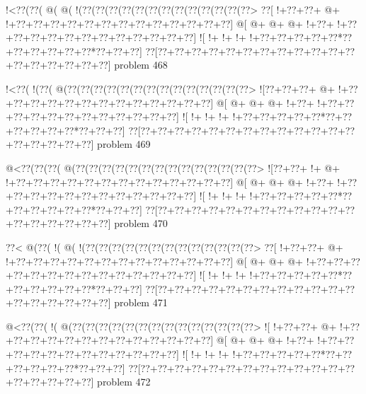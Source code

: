 \vbox{\vbox{\goo
\- !<\0??(\0??(\- @(\- @(\- !(\0??(\0??(\0??(\0??(\0??(\0??(\0??(\0??(\0??(\0??(\0??(\0??(\0??>
\0??[\- !+\0??+\0??+\- @+\- !+\0??+\0??+\0??+\0??+\0??+\0??+\0??+\0??+\0??+\0??+\0??+\0??+\0??]
\- @[\- @+\- @+\- @+\- !+\0??+\- !+\0??+\0??+\0??+\0??+\0??+\0??+\0??+\0??+\0??+\0??+\0??+\0??]
\- ![\- !+\- !+\- !+\- !+\0??+\0??+\0??+\0??+\0??*\0??+\0??+\0??+\0??+\0??+\0??*\0??+\0??+\0??]
\0??[\0??+\0??+\0??+\0??+\0??+\0??+\0??+\0??+\0??+\0??+\0??+\0??+\0??+\0??+\0??+\0??+\0??+\0??]
}
\hfil problem 468\hfil\break
}



\vbox{\vbox{\goo
\- !<\0??(\- !(\0??(\- @(\0??(\0??(\0??(\0??(\0??(\0??(\0??(\0??(\0??(\0??(\0??(\0??(\0??(\0??>
\- ![\0??+\0??+\0??+\- @+\- !+\0??+\0??+\0??+\0??+\0??+\0??+\0??+\0??+\0??+\0??+\0??+\0??+\0??]
\- @[\- @+\- @+\- @+\- !+\0??+\- !+\0??+\0??+\0??+\0??+\0??+\0??+\0??+\0??+\0??+\0??+\0??+\0??]
\- ![\- !+\- !+\- !+\- !+\0??+\0??+\0??+\0??+\0??*\0??+\0??+\0??+\0??+\0??+\0??*\0??+\0??+\0??]
\0??[\0??+\0??+\0??+\0??+\0??+\0??+\0??+\0??+\0??+\0??+\0??+\0??+\0??+\0??+\0??+\0??+\0??+\0??]
}
\hfil problem 469\hfil\break
}



\vbox{\vbox{\goo
\- @<\0??(\0??(\0??(\- @(\0??(\0??(\0??(\0??(\0??(\0??(\0??(\0??(\0??(\0??(\0??(\0??(\0??(\0??>
\- ![\0??+\0??+\- !+\- @+\- !+\0??+\0??+\0??+\0??+\0??+\0??+\0??+\0??+\0??+\0??+\0??+\0??+\0??]
\- @[\- @+\- @+\- @+\- !+\0??+\- !+\0??+\0??+\0??+\0??+\0??+\0??+\0??+\0??+\0??+\0??+\0??+\0??]
\- ![\- !+\- !+\- !+\- !+\0??+\0??+\0??+\0??+\0??*\0??+\0??+\0??+\0??+\0??+\0??*\0??+\0??+\0??]
\0??[\0??+\0??+\0??+\0??+\0??+\0??+\0??+\0??+\0??+\0??+\0??+\0??+\0??+\0??+\0??+\0??+\0??+\0??]
}
\hfil problem 470\hfil\break
}



\vbox{\vbox{\goo
\0??<\- @(\0??(\- !(\- @(\- !(\0??(\0??(\0??(\0??(\0??(\0??(\0??(\0??(\0??(\0??(\0??(\0??(\0??>
\0??[\- !+\0??+\0??+\- @+\- !+\0??+\0??+\0??+\0??+\0??+\0??+\0??+\0??+\0??+\0??+\0??+\0??+\0??]
\- @[\- @+\- @+\- @+\- !+\0??+\0??+\0??+\0??+\0??+\0??+\0??+\0??+\0??+\0??+\0??+\0??+\0??+\0??]
\- ![\- !+\- !+\- !+\- !+\0??+\0??+\0??+\0??+\0??*\0??+\0??+\0??+\0??+\0??+\0??*\0??+\0??+\0??]
\0??[\0??+\0??+\0??+\0??+\0??+\0??+\0??+\0??+\0??+\0??+\0??+\0??+\0??+\0??+\0??+\0??+\0??+\0??]
}
\hfil problem 471\hfil\break
}



\vbox{\vbox{\goo
\- @<\0??(\0??(\- !(\- @(\0??(\0??(\0??(\0??(\0??(\0??(\0??(\0??(\0??(\0??(\0??(\0??(\0??(\0??>
\- ![\- !+\0??+\0??+\- @+\- !+\0??+\0??+\0??+\0??+\0??+\0??+\0??+\0??+\0??+\0??+\0??+\0??+\0??]
\- @[\- @+\- @+\- @+\- !+\0??+\- !+\0??+\0??+\0??+\0??+\0??+\0??+\0??+\0??+\0??+\0??+\0??+\0??]
\- ![\- !+\- !+\- !+\- !+\0??+\0??+\0??+\0??+\0??*\0??+\0??+\0??+\0??+\0??+\0??*\0??+\0??+\0??]
\0??[\0??+\0??+\0??+\0??+\0??+\0??+\0??+\0??+\0??+\0??+\0??+\0??+\0??+\0??+\0??+\0??+\0??+\0??]
}
\hfil problem 472\hfil\break
}



